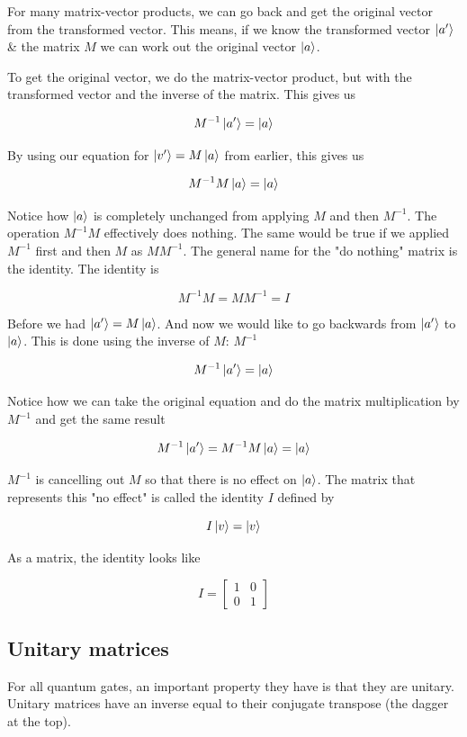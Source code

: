 For many matrix-vector products, we can go back and get the original vector from the transformed vector. This means, if we know the transformed vector $\ket{a'}$ \&  the matrix $M$ we can work out the original vector $\ket{a}$. 

To get the original vector, we do the matrix-vector product, but with the transformed vector and the inverse of the matrix. This gives us 

$$
M^{-1}\ket{a'} = \ket{a}
$$

By using our equation for $\ket{v'} = M\ket{a}$ from earlier, this gives us 

$$ M^{-1}M\ket{a} = \ket{a} $$

Notice how $\ket{a}$ is completely unchanged from applying $M$ and then $M^{-1}$. The operation $M^{-1}M$ effectively does nothing. The same would be true if we applied $M^{-1}$ first and then $M$ as $MM^{-1}$. The general name for the "do nothing" matrix is the identity. The identity is

$$M^{-1}M = MM^{-1} = I $$

Before we had $\ket{a'} = M\ket{a}$. And now we would like to go backwards from $\ket{a'}$ to $\ket{a}$. This is done using the inverse of $M$: $M^{-1}$

$$ M^{-1}\ket{a'} = \ket{a} $$

Notice how we can take the original equation and do the matrix multiplication by $M^{-1}$ and get the same result

$$ M^{-1}\ket{a'} = M^{-1}M\ket{a} = \ket{a} $$

$M^{-1}$ is cancelling out $M$ so that there is no effect on $\ket{a}$. The matrix that represents this "no effect" is called the identity $I$ defined by 

$$ I\ket{v} = \ket{v}$$

As a matrix, the identity looks like 

$$ I = \begin{bmatrix} 1 & 0 \\ 0 & 1 \end{bmatrix}$$

\subsection{ Unitary matrices} 

For all quantum gates, an important property they have is that they are unitary. Unitary matrices have an inverse equal to their conjugate transpose (the dagger at the top).

